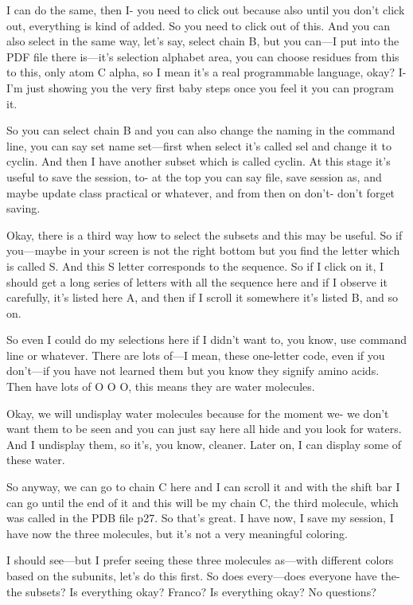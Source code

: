 I can do the same, then I- you need to click out because also until you don't click out, everything is kind of added. So you need to click out of this. And you can also select in the same way, let's say, select chain B, but you can—I put into the PDF file there is—it's selection alphabet area, you can choose residues from this to this, only atom C alpha, so I mean it's a real programmable language, okay? I- I'm just showing you the very first baby steps once you feel it you can program it.

So you can select chain B and you can also change the naming in the command line, you can say set name set—first when select it's called sel and change it to cyclin. And then I have another subset which is called cyclin. At this stage it's useful to save the session, to- at the top you can say file, save session as, and maybe update class practical or whatever, and from then on don't- don't forget saving.

Okay, there is a third way how to select the subsets and this may be useful. So if you—maybe in your screen is not the right bottom but you find the letter which is called S. And this S letter corresponds to the sequence. So if I click on it, I should get a long series of letters with all the sequence here and if I observe it carefully, it's listed here A, and then if I scroll it somewhere it's listed B, and so on.

So even I could do my selections here if I didn't want to, you know, use command line or whatever. There are lots of—I mean, these one-letter code, even if you don't—if you have not learned them but you know they signify amino acids. Then have lots of O O O, this means they are water molecules.

Okay, we will undisplay water molecules because for the moment we- we don't want them to be seen and you can just say here all hide and you look for waters. And I undisplay them, so it's, you know, cleaner. Later on, I can display some of these water.

So anyway, we can go to chain C here and I can scroll it and with the shift bar I can go until the end of it and this will be my chain C, the third molecule, which was called in the PDB file p27. So that's great. I have now, I save my session, I have now the three molecules, but it's not a very meaningful coloring.

I should see—but I prefer seeing these three molecules as—with different colors based on the subunits, let's do this first. So does every—does everyone have the- the subsets? Is everything okay? Franco? Is everything okay? No questions?

